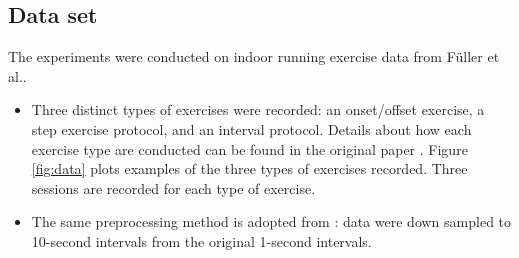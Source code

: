 \subsection{Data set}
    The experiments were conducted on indoor running exercise data from F\"{u}ller et al..
    \begin{itemize}
        \item Three distinct types of exercises were recorded: an onset/offset exercise, a step exercise protocol, and an interval protocol. Details about how each exercise type are conducted can be found in the original paper \cite{Fueller15}. Figure \ref{fig:data} plots examples of the three types of exercises recorded. Three sessions are recorded for each type of exercise.
        \item The same preprocessing method is adopted from \cite{Fueller15}: data were down sampled to 10-second intervals from the original 1-second intervals.
    \end{itemize}

